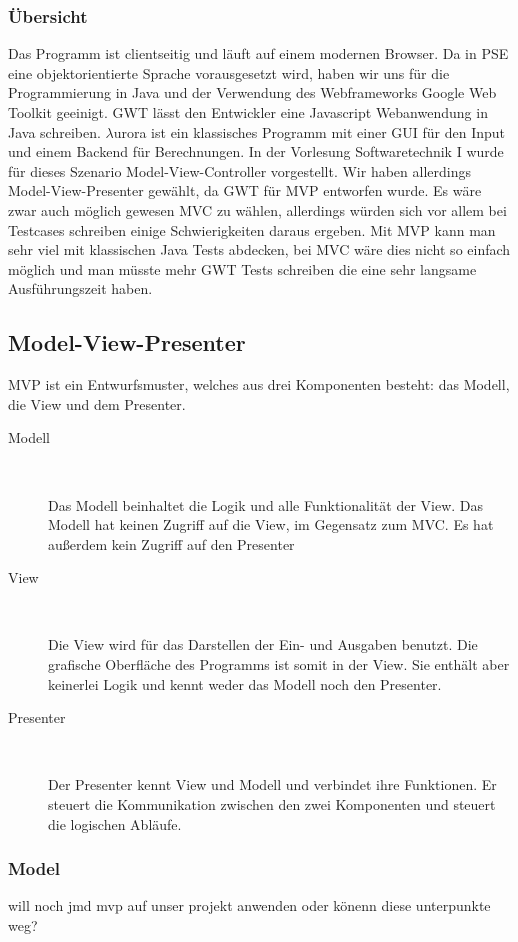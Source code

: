 \documentclass[parskip=full,11pt,twoside]{scrbook}
\begin{document}
\subsubsection{Übersicht}
Das Programm ist clientseitig und läuft auf einem modernen Browser. Da in PSE eine objektorientierte Sprache vorausgesetzt wird, haben wir uns für die Programmierung in Java und der Verwendung des Webframeworks Google Web Toolkit geeinigt. GWT lässt den Entwickler eine Javascript Webanwendung in Java schreiben.
$\lambda$urora ist ein klassisches Programm mit einer GUI für den Input und einem Backend für Berechnungen. In der Vorlesung Softwaretechnik I wurde für dieses Szenario Model-View-Controller vorgestellt.
Wir haben allerdings  Model-View-Presenter gewählt, da GWT für MVP entworfen wurde. Es wäre zwar auch möglich gewesen MVC zu wählen, allerdings würden sich vor allem bei Testcases schreiben einige Schwierigkeiten daraus ergeben. Mit MVP kann man sehr viel mit klassischen Java Tests abdecken, bei MVC wäre dies nicht so einfach möglich und man müsste mehr GWT Tests schreiben die eine sehr langsame Ausführungszeit haben.

\subsection{Model-View-Presenter}
MVP ist ein Entwurfsmuster, welches aus drei Komponenten besteht: das Modell, die View und dem Presenter.
\begin{description}
	\item[Modell] ~\par
	Das Modell beinhaltet die Logik und alle Funktionalität der View. Das Modell hat keinen Zugriff auf die View, im Gegensatz zum MVC. Es hat außerdem kein Zugriff auf den Presenter 
	\item[View] ~\par
	Die View wird für das Darstellen der Ein- und Ausgaben benutzt. Die grafische Oberfläche des Programms ist somit in der View. Sie enthält aber keinerlei Logik und kennt weder das Modell noch den Presenter.
	
	\item[Presenter] ~\par
	Der Presenter kennt View und Modell und verbindet ihre Funktionen. Er steuert die Kommunikation zwischen den zwei Komponenten und steuert die logischen Abläufe.
\end{description}


\subsubsection{Model}
 will noch jmd mvp auf unser projekt anwenden oder könenn diese unterpunkte weg?
\end{document}
